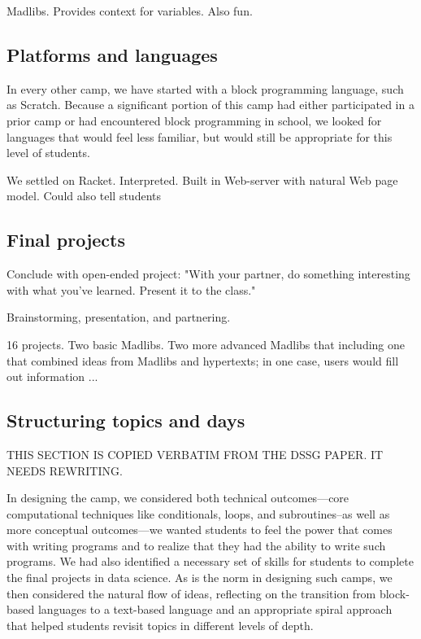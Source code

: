Madlibs.  Provides context for variables.  Also fun.

\subsection{Platforms and languages}

In every other camp, we have started with a block programming language,
such as Scratch.  Because a significant portion of this camp had
either participated in a prior camp or had encountered block
programming in school, we looked for languages that would feel less
familiar, but would still be appropriate for this level of students.

We settled on Racket.  Interpreted.  Built in Web-server with natural
Web page model.  Could also tell students

\subsection{Final projects}

Conclude with open-ended project: "With your partner, do something
interesting with what you've learned.  Present it to the class."

Brainstorming, presentation, and partnering.

16 projects.  Two basic Madlibs.  Two
more advanced Madlibs that including one that combined ideas from Madlibs 
and hypertexts; in one case, users would fill out information ...

\subsection{Structuring topics and days}

THIS SECTION IS COPIED VERBATIM FROM THE DSSG PAPER.  IT NEEDS
REWRITING.

In designing the camp, we considered both technical outcomes---core
computational techniques like conditionals, loops, and subroutines--as
well as more conceptual outcomes---we wanted students to feel the
power that comes with writing programs and to realize that they had
the ability to write such programs.  We had also identified a
necessary set of skills for students to complete the final projects
in data science.  As is the norm in designing such camps, we then
considered the natural flow of ideas, reflecting on the transition
from block-based languages to a text-based language and an appropriate
spiral approach that helped students revisit topics in different
levels of depth.

